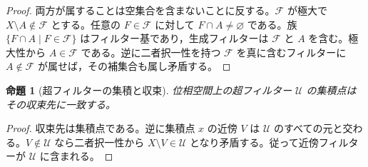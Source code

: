 \documentclass[a5paper,10pt,dvipdfmx]{jsarticle}
\theoremstyle{definition}
\theoremstyle{plain}
\newtheorem{prop}[ruledef]{命題}
\begin{document}
\begin{proof}
両方が属することは空集合を含まないことに反する。$\mathcal F$ が極大で $X\setminus A\notin\mathcal F$ とする。任意の $F\in\mathcal F$ に対して $F\cap A\ne\varnothing$ である。族 $\{F\cap A\mid F\in\mathcal F\}$ はフィルター基であり，生成フィルターは $\mathcal F$ と $A$ を含む。極大性から $A\in\mathcal F$ である。逆に二者択一性を持つ $\mathcal F$ を真に含むフィルターに $A\notin\mathcal F$ が属せば，その補集合も属し矛盾する。
\end{proof}
\begin{prop}[超フィルターの集積と収束]\label{k272}
位相空間上の超フィルター $\mathcal U$ の集積点はその収束先に一致する。
\end{prop}
\begin{proof}
収束先は集積点である。逆に集積点 $x$ の近傍 $V$ は $\mathcal U$ のすべての元と交わる。$V\notin\mathcal U$ なら二者択一性から $X\setminus V\in\mathcal U$ となり矛盾する。従って近傍フィルターが $\mathcal U$ に含まれる。
\end{proof}
\end{document}
